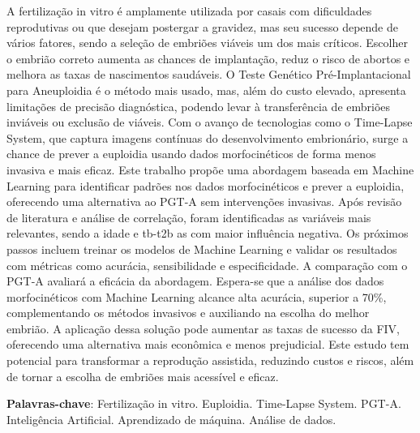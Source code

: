\begin{resumo}
A fertilização in vitro é amplamente utilizada por casais com dificuldades reprodutivas ou que desejam postergar a gravidez, mas seu sucesso depende de vários fatores, sendo a seleção de embriões viáveis um dos mais críticos. Escolher o embrião correto aumenta as chances de implantação, reduz o risco de abortos e melhora as taxas de nascimentos saudáveis. O Teste Genético Pré-Implantacional para Aneuploidia é o método mais usado, mas, além do custo elevado, apresenta limitações de precisão diagnóstica, podendo levar à transferência de embriões inviáveis ou exclusão de viáveis. Com o avanço de tecnologias como o Time-Lapse System, que captura imagens contínuas do desenvolvimento embrionário, surge a chance de prever a euploidia usando dados morfocinéticos de forma menos invasiva e mais eficaz. Este trabalho propõe uma abordagem baseada em Machine Learning para identificar padrões nos dados morfocinéticos e prever a euploidia, oferecendo uma alternativa ao PGT-A sem intervenções invasivas. Após revisão de literatura e análise de correlação, foram identificadas as variáveis mais relevantes, sendo a idade e tb-t2b as com maior influência negativa. Os próximos passos incluem treinar os modelos de Machine Learning e validar os resultados com métricas como acurácia, sensibilidade e especificidade. A comparação com o PGT-A avaliará a eficácia da abordagem. Espera-se que a análise dos dados morfocinéticos com Machine Learning alcance alta acurácia, superior a 70\%, complementando os métodos invasivos e auxiliando na escolha do melhor embrião. A aplicação dessa solução pode aumentar as taxas de sucesso da FIV, oferecendo uma alternativa mais econômica e menos prejudicial. Este estudo tem potencial para transformar a reprodução assistida, reduzindo custos e riscos, além de tornar a escolha de embriões mais acessível e eficaz.

 \vspace{\onelineskip}
    
\noindent
\textbf{Palavras-chave}: Fertilização in vitro. Euploidia. Time-Lapse System. PGT-A. Inteligência Artificial. Aprendizado de máquina. Análise de dados.

\end{resumo}
